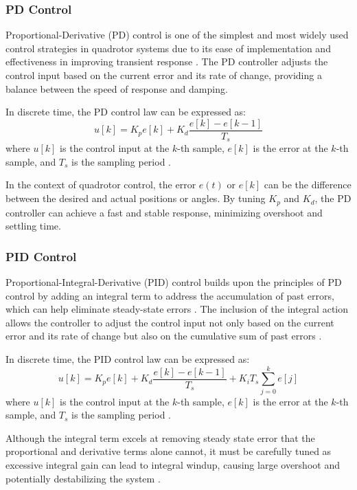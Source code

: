 \documentclass{UoNMCHA}
\numberwithin{equation}{section}
\begin{document}
\subsubsection{PD Control}
Proportional-Derivative (PD) control is one of the simplest and most widely used control strategies in quadrotor systems due to its ease of implementation and effectiveness in improving transient response \cite{website:TransientResponse}. The PD controller adjusts the control input based on the current error and its rate of change, providing a balance between the speed of response and damping.

In discrete time, the PD control law can be expressed as:
\begin{equation}
u[k] = K_p e[k] + K_d \frac{e[k] - e[k-1]}{T_s}
\end{equation}
where \( u[k] \) is the control input at the \( k \)-th sample, \( e[k] \) is the error at the \( k \)-th sample, and \( T_s \) is the sampling period \cite{PID}.

In the context of quadrotor control, the error \( e(t) \) or \( e[k] \) can be the difference between the desired and actual positions or angles. By tuning \( K_p \) and \( K_d \), the PD controller can achieve a fast and stable response, minimizing overshoot and settling time.
\subsubsection{PID Control}
Proportional-Integral-Derivative (PID) control builds upon the principles of PD control by adding an integral term to address the accumulation of past errors, which can help eliminate steady-state errors . The inclusion of the integral action allows the controller to adjust the control input not only based on the current error and its rate of change but also on the cumulative sum of past errors \cite{PID}.

In discrete time, the PID control law can be expressed as:
\begin{equation}
u[k] = K_p e[k] + K_d \frac{e[k] - e[k-1]}{T_s} + K_i T_s \sum_{j=0}^{k} e[j]
\end{equation}
where \( u[k] \) is the control input at the \( k \)-th sample, \( e[k] \) is the error at the \( k \)-th sample, and \( T_s \) is the sampling period \cite{PID}.

Although the integral term excels at removing steady state error that the proportional and derivative terms alone cannot, it must be carefully tuned as excessive integral gain can lead to integral windup, causing large overshoot and potentially destabilizing the system \cite{website:intWindup}.
\end{document}
